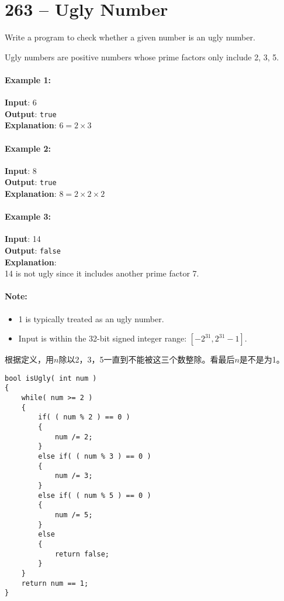 \section{263 -- Ugly Number}
Write a program to check whether a given number is an ugly number.
\par
Ugly numbers are positive numbers whose prime factors only include 2, 3, 5.

\paragraph{Example 1:}

\begin{flushleft}
\textbf{Input}: 6
\\
\textbf{Output}: \texttt{true}
\\
\textbf{Explanation}: $6 = 2 \times 3$
\end{flushleft}


\paragraph{Example 2:}

\begin{flushleft}
\textbf{Input}: 8
\\
\textbf{Output}: \texttt{true}
\\
\textbf{Explanation}: $8 = 2 \times 2 \times 2$
\end{flushleft}

\paragraph{Example 3:}

\begin{flushleft}
\textbf{Input}: 14
\\
\textbf{Output}: \texttt{false} 
\\
\textbf{Explanation}: 
\\
14 is not ugly since it includes another prime factor 7.
\end{flushleft}

\paragraph{Note:}
\begin{itemize}
\item 1 is typically treated as an ugly number.
\item Input is within the 32-bit signed integer range: $[−2^{31},  2^{31} − 1]$.
\end{itemize}
根据定义，用$n$除以2，3，5一直到不能被这三个数整除。看最后$n$是不是为1。
\setcounter{lstlisting}{0}
\begin{lstlisting}[style=customc, caption={Divide}]
bool isUgly( int num )
{
    while( num >= 2 )
    {
        if( ( num % 2 ) == 0 )
        {
            num /= 2;
        }
        else if( ( num % 3 ) == 0 )
        {
            num /= 3;
        }
        else if( ( num % 5 ) == 0 )
        {
            num /= 5;
        }
        else
        {
            return false;
        }
    }
    return num == 1;
}
\end{lstlisting}